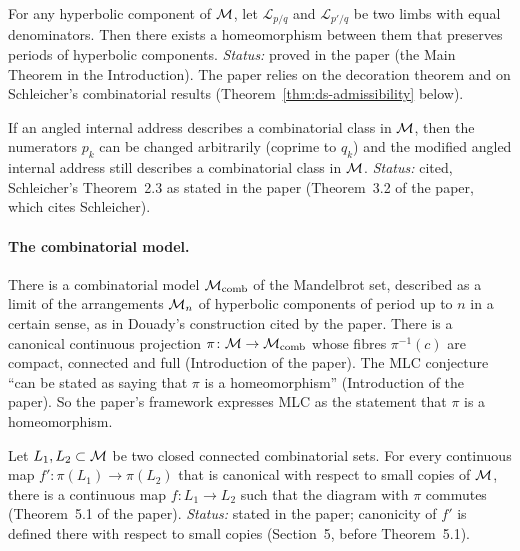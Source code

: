 \begin{theorem}
\label{thm:ds-main}
For any hyperbolic component of $\mathcal M$, let $\mathcal L_{p/q}$ and $\mathcal L_{p'/q}$ be two limbs with equal denominators.  Then
there exists a homeomorphism between them that preserves periods of hyperbolic components.  \emph{Status:} proved in the paper
(the Main Theorem in the Introduction).  The paper relies on the decoration theorem and on Schleicher's combinatorial
results (Theorem~\ref{thm:ds-admissibility} below).
\end{theorem}

\begin{theorem}
\label{thm:ds-admissibility}
If an angled internal address describes a combinatorial class in $\mathcal M$, then the numerators $p_k$ can be changed arbitrarily
(coprime to $q_k$) and the modified angled internal address still describes a combinatorial class in $\mathcal M$.  \emph{Status:} cited,
Schleicher's Theorem~2.3 as stated in the paper (Theorem~3.2 of the paper, which cites Schleicher).
\end{theorem}

\paragraph{The combinatorial model.}
There is a combinatorial model $\mathcal M_{\rm comb}$ of the Mandelbrot set, described as a limit of the arrangements $\mathcal M_n$ of hyperbolic
components of period up to $n$ in a certain sense, as in Douady's construction cited by the paper.  There is a canonical continuous
projection $\pi\colon\mathcal M\to\mathcal M_{\rm comb}$ whose fibres $\pi^{-1}(c)$ are compact, connected and full (Introduction of the paper).
The MLC conjecture ``can be stated as saying that $\pi$ is a homeomorphism'' (Introduction of the paper).  So the paper's framework expresses
MLC as the statement that $\pi$ is a homeomorphism.

\begin{theorem}
\label{thm:ds-lifting}
Let $L_1,L_2\subset\mathcal M$ be two closed connected combinatorial sets.  For every continuous map
$f'\colon\pi(L_1)\to\pi(L_2)$ that is canonical with respect to small copies of $\mathcal M$, there is a continuous map
$f\colon L_1\to L_2$ such that the diagram with $\pi$ commutes (Theorem~5.1 of the paper).  \emph{Status:} stated in
the paper; canonicity of $f'$ is defined there with respect to small copies (Section~5, before Theorem~5.1).
\end{theorem}

